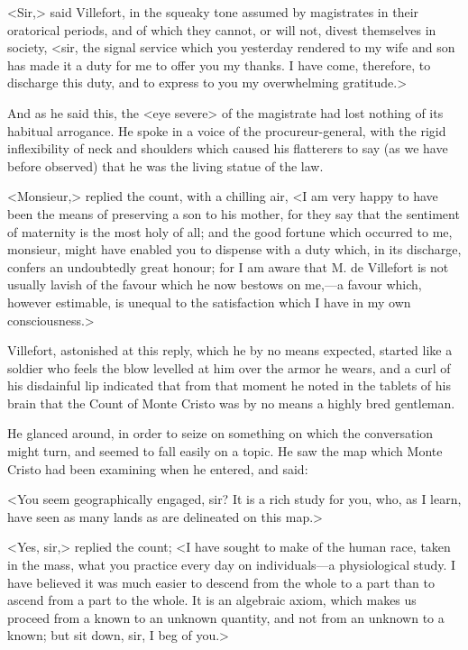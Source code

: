  <Sir,> said Villefort, in the squeaky tone assumed by magistrates in their oratorical periods, and of which they cannot, or will not, divest themselves in society, <sir, the signal service which you yesterday rendered to my wife and son has made it a duty for me to offer you my thanks. I have come, therefore, to discharge this duty, and to express to you my overwhelming gratitude.> 

 And as he said this, the <eye severe> of the magistrate had lost nothing of its habitual arrogance. He spoke in a voice of the procureur-general, with the rigid inflexibility of neck and shoulders which caused his flatterers to say (as we have before observed) that he was the living statue of the law. 

 <Monsieur,> replied the count, with a chilling air, <I am very happy to have been the means of preserving a son to his mother, for they say that the sentiment of maternity is the most holy of all; and the good fortune which occurred to me, monsieur, might have enabled you to dispense with a duty which, in its discharge, confers an undoubtedly great honour; for I am aware that M. de Villefort is not usually lavish of the favour which he now bestows on me,—a favour which, however estimable, is unequal to the satisfaction which I have in my own consciousness.> 

 Villefort, astonished at this reply, which he by no means expected, started like a soldier who feels the blow levelled at him over the armor he wears, and a curl of his disdainful lip indicated that from that moment he noted in the tablets of his brain that the Count of Monte Cristo was by no means a highly bred gentleman. 

 He glanced around, in order to seize on something on which the conversation might turn, and seemed to fall easily on a topic. He saw the map which Monte Cristo had been examining when he entered, and said: 

 <You seem geographically engaged, sir? It is a rich study for you, who, as I learn, have seen as many lands as are delineated on this map.> 

 <Yes, sir,> replied the count; <I have sought to make of the human race, taken in the mass, what you practice every day on individuals—a physiological study. I have believed it was much easier to descend from the whole to a part than to ascend from a part to the whole. It is an algebraic axiom, which makes us proceed from a known to an unknown quantity, and not from an unknown to a known; but sit down, sir, I beg of you.> 

